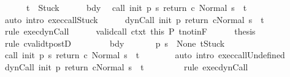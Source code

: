 \begin{isabellebody}
\ \ \ \ \ \ {\isachardoublequoteopen}t\ {\isacharequal}\ Stuck{\isachardoublequoteclose}\isanewline
\ \ \ \ \isamarkupfalse%
\ bdy\ \isamarkupfalse%
\ {\isachardoublequoteopen}{\isasymGamma}{\isasymturnstile}{\isasymlangle}call\ init\ {\isacharparenleft}p\ s{\isacharparenright}\ return{\isacharprime}\ c\ {\isacharcomma}Normal\ s{\isasymrangle}\ {\isasymRightarrow}\ t{\isachardoublequoteclose}\isanewline
\ \ \ \ \ \ \isamarkupfalse%
\ {\isacharparenleft}auto\ intro{\isacharcolon}\ exec{\isacharunderscore}callStuck{\isacharparenright}\isanewline
\ \ \ \ \isamarkupfalse%
\ {\isachardoublequoteopen}{\isasymGamma}{\isasymturnstile}{\isasymlangle}dynCall\ init\ p\ return{\isacharprime}\ c{\isacharcomma}Normal\ s{\isasymrangle}\ {\isasymRightarrow}\ t{\isachardoublequoteclose}\ \isanewline
\ \ \ \ \ \ \isamarkupfalse%
\ {\isacharparenleft}rule\ exec{\isacharunderscore}dynCall{\isacharparenright}\isanewline
\ \ \ \ \isamarkupfalse%
\ valid{\isacharunderscore}call\ ctxt\ this\ P\ t{\isacharunderscore}notin{\isacharunderscore}F\isanewline
\ \ \ \ \isamarkupfalse%
\ {\isacharquery}thesis\isanewline
\ \ \ \ \ \ \isamarkupfalse%
\ {\isacharparenleft}rule\ cvalidt{\isacharunderscore}postD{\isacharparenright}\isanewline
\ \ \isamarkupfalse%
\isanewline
\ \ \ \ \isamarkupfalse%
\ bdy\isanewline
\ \ \ \ \isamarkupfalse%
\ {\isachardoublequoteopen}{\isasymGamma}\ {\isacharparenleft}p\ s{\isacharparenright}\ {\isacharequal}\ None{\isachardoublequoteclose}\ {\isachardoublequoteopen}t{\isacharequal}Stuck{\isachardoublequoteclose}\isanewline
\ \ \ \ \isamarkupfalse%
\ {\isachardoublequoteopen}{\isasymGamma}{\isasymturnstile}{\isasymlangle}call\ init\ {\isacharparenleft}p\ s{\isacharparenright}\ return{\isacharprime}\ c\ {\isacharcomma}Normal\ s{\isasymrangle}\ {\isasymRightarrow}\ t{\isachardoublequoteclose}\isanewline
\ \ \ \ \ \ \isamarkupfalse%
\ {\isacharparenleft}auto\ intro{\isacharcolon}\ exec{\isacharunderscore}callUndefined{\isacharparenright}\isanewline
\ \ \ \ \isamarkupfalse%
\ {\isachardoublequoteopen}{\isasymGamma}{\isasymturnstile}{\isasymlangle}dynCall\ init\ p\ return{\isacharprime}\ c{\isacharcomma}Normal\ s{\isasymrangle}\ {\isasymRightarrow}\ t{\isachardoublequoteclose}\ \isanewline
\ \ \ \ \ \ \isamarkupfalse%
\ {\isacharparenleft}rule\ exec{\isacharunderscore}dynCall{\isacharparenright}\isanewline
\ \ \ \ \isamarkupfalse%

\end{isabellebody}
